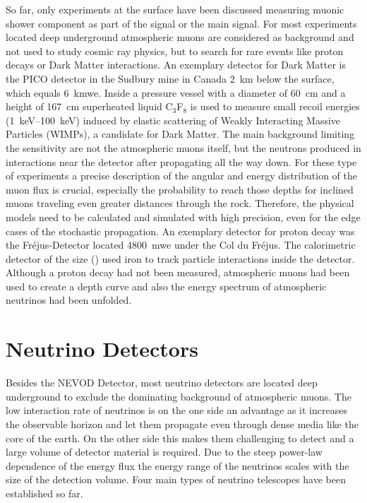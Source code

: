 So far, only experiments at the surface have been discussed measuring muonic shower component as part of the signal or the main signal.
For most experiments located deep underground atmospheric muons are considered as background and not used to study cosmic ray physics, but to search for rare events like proton decays or Dark Matter interactions.
An exemplary detector for Dark Matter is the PICO detector \cite{Amole19PICO} in the Sudbury mine in Canada \SI{2}{km} below the surface, which equals \SI{6}{kmwe}.
Inside a pressure vessel with a diameter of \SI{60}{cm} and a height of \SI{167}{cm} superheated liquid C$_3$F$_8$ is used to measure small recoil energies (\SIrange{1}{100}{keV}) induced by elastic scattering of Weakly Interacting Massive Particles (WIMPs), a candidate for Dark Matter.
The main background limiting the sensitivity are not the atmospheric muons itself, but the neutrons produced in interactions near the detector after propagating all the way down.
For these type of experiments a precise description of the angular and energy distribution of the muon flux is crucial, especially the probability to reach those depths for inclined muons traveling even greater distances through the rock.
Therefore, the physical models need to be calculated and simulated with high precision, even for the edge cases of the stochastic propagation.
An exemplary detector for proton decay was the Fr\'{e}jus-Detector \cite{Frejus95nu} located \SI{4800}{mwe} under the Col du Fr\'{e}jus.
The calorimetric detector of the size () used iron to track particle interactions inside the detector.
Although a proton decay had not been measured, atmospheric muons had been used to create a depth curve and also the energy spectrum of atmospheric neutrinos had been unfolded.

%
%
%
%

\section{Neutrino Detectors}

Besides the NEVOD Detector, most neutrino detectors are located deep underground to exclude the dominating background of atmospheric muons.
The low interaction rate of neutrinos is on the one side an advantage as it increases the observable horizon and let them propagate even through dense media like the core of the earth.
On the other side this makes them challenging to detect and a large volume of detector material is required.
Due to the steep power-law dependence of the energy flux the energy range of the neutrinos scales with the size of the detection volume.
Four main types of neutrino telescopes have been established so far.

